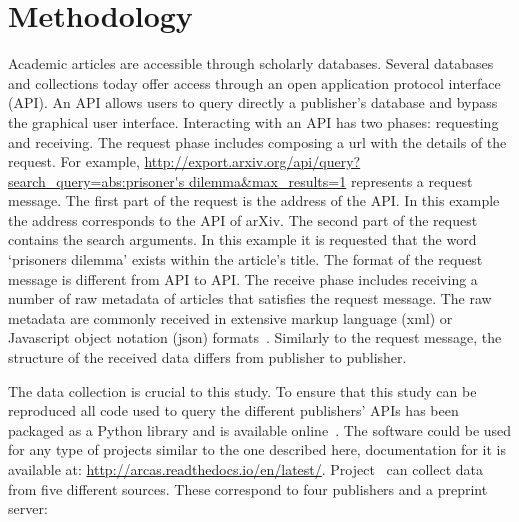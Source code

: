 \documentclass{article}
\theoremstyle{definition}
\begin{document}
\section{Methodology}\label{section:methodology}

Academic articles are accessible through scholarly databases. Several databases
and collections today offer access through an open application protocol
interface (API). An API allows users to query directly a publisher's database and
bypass the graphical user interface. Interacting with an API has two phases:
requesting and receiving. The request phase includes composing a url with the
details of the request. For example,
\url{http://export.arxiv.org/api/query?search_query=abs:prisoner's
dilemma&max_results=1} represents a request message. The first part of the
request is the address of the API. In this example the address corresponds to
the API of arXiv. The second part of the request contains the search arguments.
In this example it is requested that the word `prisoners dilemma' exists within
the article's title. The format of the request message is different from API to
API. The receive phase includes receiving a number of raw metadata of articles
that satisfies the request message. The raw metadata are commonly received in
extensive markup language (xml) or Javascript object notation (json)
formats~\citep{nurseitov2009}. Similarly to the request message, the structure of
the received data differs from publisher
to publisher.

The data collection is crucial to this study. To ensure that this study can be
reproduced all code used to query the different publishers' APIs has been packaged as a
Python library and is available online~\citep{nikoleta_2017}. The software could
be used for any type of projects similar to the one described here,
documentation for it is available at:
\url{http://arcas.readthedocs.io/en/latest/}. Project~\citep{nikoleta_2017} can
collect data from five different sources. These correspond to four
publishers and a preprint server:
\end{document}
